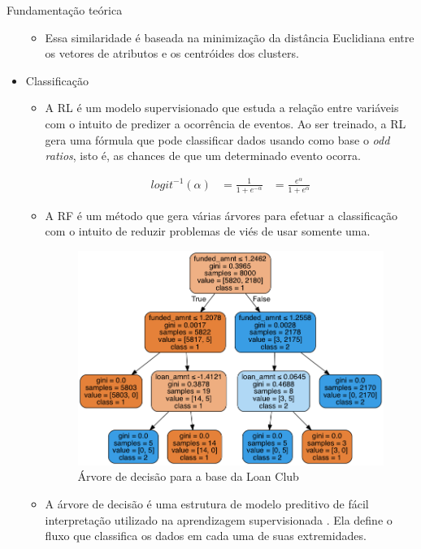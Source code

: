 \documentclass[final,hyperref={pdfpagelabels=false, brazil}]{beamer}
\let\olditem=\item%
\renewcommand{\item}{\olditem \justifying}%
\begin{document}
\begin{frame}[t]
\begin{columns}[t]
\begin{column}{.465\textwidth}
\begin{block}{Fundamenta\c c\~ao te\'orica}
\begin{itemize}
\begin{itemize}
\item Essa similaridade é baseada na minimização da distância Euclidiana entre os vetores de atributos e os centróides dos clusters.

\end{itemize}
\item Classificação
\begin{itemize}
\item A RL é um modelo supervisionado que estuda a relação entre variáveis com o intuito de predizer a ocorrência de eventos. Ao ser treinado, a RL gera uma fórmula que pode classificar dados usando como base o \emph{odd ratios}, isto é, as chances de que um determinado evento ocorra\cite{HASTIE}. 

\begin{equation}
  \label{eq:t}
  \begin{aligned}
    logit^{-1}(\alpha) &= \frac{1}{1+e^{-\alpha}} &= \frac{e^{\alpha}}{1+e^{\alpha}}
  \end{aligned}
\end{equation}

\end{itemize}

\begin{itemize}
\item A RF é um método que gera várias árvores para efetuar a classificação com o intuito de reduzir problemas de viés de usar somente uma. 

\begin{figure}
\caption{Árvore de decisão para a base da Loan Club}
\centering
\includegraphics[width=0.66\linewidth]{loan.png}

\end{figure}

\item A árvore de decisão é uma estrutura de modelo preditivo de fácil interpretação utilizado na aprendizagem supervisionada \cite{HASTIE}. Ela define o fluxo que classifica os dados em cada uma de suas extremidades.



\end{itemize}
\end{itemize}
\end{block}
\end{column}
\end{columns}
\end{frame}
\end{document}

